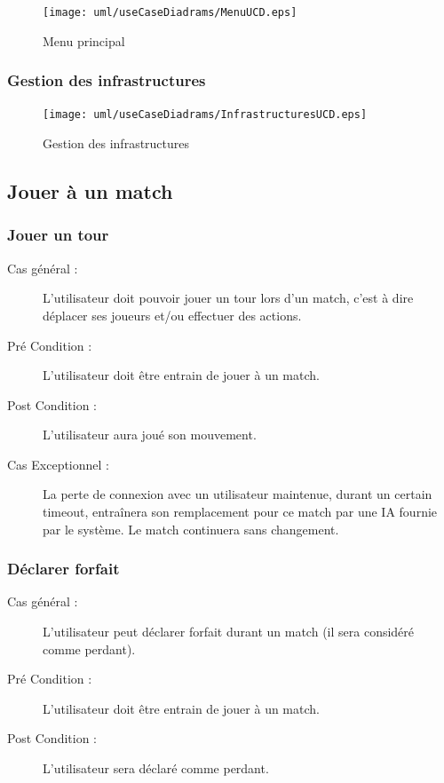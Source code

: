 \documentclass[a4paper]{report}
\begin{document}
\begin{figure}[H]
    \begin{center}
        \texttt{[image: uml/useCaseDiadrams/MenuUCD.eps]}
        \caption{Menu principal}
    \end{center}
\end{figure}

\subsubsection{Gestion des infrastructures}
\begin{figure}[H]
    \begin{center}
        \texttt{[image: uml/useCaseDiadrams/InfrastructuresUCD.eps]}
        \caption{Gestion des infrastructures}
    \end{center}
\end{figure}


\subsection{Jouer à un match}
\subsubsection{Jouer un tour}
\begin{description}
    \item[Cas général :] L'\gls{utilisateur} doit pouvoir jouer un tour lors d'un match, c'est à dire déplacer ses \glspl{joueur} et/ou effectuer des actions.
    \item[Pré Condition  :] L'\gls{utilisateur} doit être entrain de jouer à un match.
    \item[Post Condition :] L'\gls{utilisateur} aura joué son mouvement.
    \item[Cas Exceptionnel :] La perte de connexion avec un \gls{utilisateur} maintenue, durant un certain timeout, entraînera son remplacement pour ce match par une IA fournie par le système. Le match continuera sans changement.
\end{description}
\subsubsection{Déclarer forfait}
\begin{description}
    \item[Cas général :] L'\gls{utilisateur} peut déclarer forfait durant un match (il sera considéré comme perdant).
    \item[Pré Condition  :] L'\gls{utilisateur} doit être entrain de jouer à un match.
    \item[Post Condition :] L'\gls{utilisateur} sera déclaré comme perdant.
\end{description}
\end{document}
